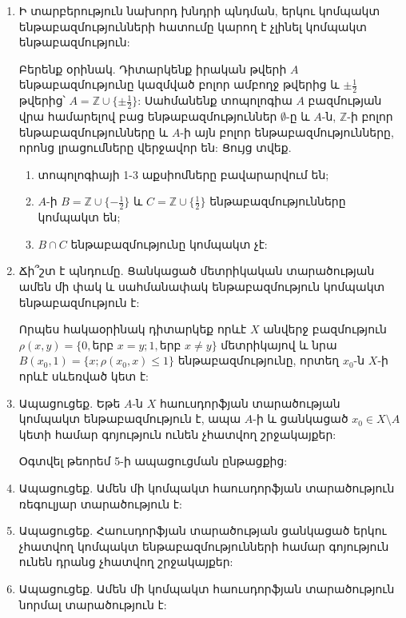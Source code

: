 \begin{enumerate}[label=\thesection.\arabic*.]
\item Ի տարբերություն նախորդ խնդրի պնդման, երկու կոմպակտ ենթաբազմությունների հատումը կարող է չլինել կոմպակտ ենթաբազմություն:
\par Բերենք օրինակ. Դիտարկենք իրական թվերի $A$ ենթաբազմությունը կազմված բոլոր ամբողջ թվերից և $\pm \frac{1}{2}$ թվերից՝ $A = \mathbb{Z} \cup \{\pm \frac{1}{2}\}$: Սահմանենք տոպոլոգիա $A$ բազմության վրա համարելով բաց ենթաբազմություններ $\emptyset$-ը և $A$-ն, $\mathbb{Z}$-ի բոլոր ենթաբազմությունները և $A$-ի այն բոլոր ենթաբազմությունները, որոնց լրացումները վերջավոր են: Ցույց տվեք.
\begin{enumerate}
    \item տոպոլոգիայի 1-3 աքսիոմները բավարարվում են;
    \item $A$-ի $B = \mathbb{Z} \cup \{-\frac{1}{2}\}$ և $C = \mathbb{Z} \cup \{\frac{1}{2}\}$ ենթաբազմությունները կոմպակտ են;
    \item $B \cap C$ ենթաբազմությունը կոմպակտ չէ:
\end{enumerate}

\item Ճի՞շտ է պնդումը. Ցանկացած մետրիկական տարածության ամեն մի փակ և սահմանափակ ենթաբազմություն կոմպակտ ենթաբազմություն է:

\begin{hint}
Որպես հակաօրինակ դիտարկեք որևէ $X$ անվերջ բազմություն $\rho(x, y) = \{ 0, \text{երբ } x=y; 1, \text{երբ } x \ne y \}$ մետրիկայով և նրա $B(x_0, 1) = \{x; \rho(x_0, x) \le 1 \}$  ենթաբազմությունը, որտեղ $x_0$-ն $X$-ի որևէ սևեռված կետ է:
\end{hint}

\item Ապացուցեք. Եթե $A$-ն $X$ հաուսդորֆյան տարածության կոմպակտ ենթաբազմություն է, ապա $A$-ի և ցանկացած $x_0 \in X \setminus A$ կետի համար գոյություն ունեն չհատվող շրջակայքեր:

\begin{hint}
Օգտվել թեորեմ 5-ի ապացուցման ընթացքից:
\end{hint}

\item Ապացուցեք. Ամեն մի կոմպակտ հաուսդորֆյան տարածություն ռեգուլյար տարածություն է:

\item Ապացուցեք. Հաուսդորֆյան տարածության ցանկացած երկու չհատվող կոմպակտ ենթաբազմությունների համար գոյություն ունեն դրանց չհատվող շրջակայքեր:

\item Ապացուցեք. Ամեն մի կոմպակտ հաուսդորֆյան տարածություն նորմալ տարածություն է:
    
\end{enumerate}
